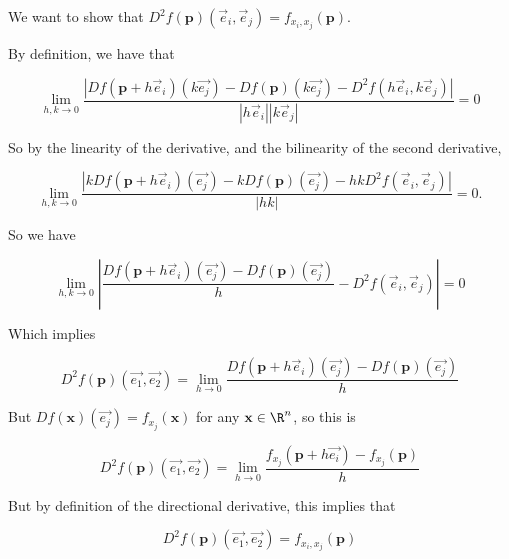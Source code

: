 \documentclass{ximera}
\begin{document}
\begin{free-response}
	We want to show that $D^2f(\mathbf{p})(\vec{e}_i,\vec{e}_j) = f_{x_i,x_j}(\mathbf{p})$.
	
	By definition, we have that 
	
	\[
		\displaystyle\lim_{h,k \to 0} \frac{\left| Df(\mathbf{p}+h\vec{e}_i)(k\vec{e_j}) - Df(\mathbf{p})(k\vec{e_j}) - D^2f(h\vec{e}_i,k\vec{e}_j) \right|}{|h\vec{e}_i||k\vec{e}_j|} = 0
	\]
	
	So by the linearity of the derivative, and the bilinearity of the second derivative,
	
	\[
		\displaystyle\lim_{h,k \to 0} \frac{\left| kDf(\mathbf{p}+h\vec{e}_i)(\vec{e_j}) - k Df(\mathbf{p})(\vec{e_j}) - hkD^2f(\vec{e}_i,\vec{e}_j) \right|}{|hk|} = 0.
	\]
	
	So we have 
	
	\[
	\displaystyle\lim_{h,k \to 0} \left| \frac{Df(\mathbf{p}+h\vec{e}_i)(\vec{e_j}) - Df(\mathbf{p})(\vec{e_j})}{h} - D^2f(\vec{e}_i,\vec{e}_j) \right|= 0
	\]
	
	Which implies
	
	\[
	  D^2f(\mathbf{p})(\vec{e_1},\vec{e_2})  = \displaystyle\lim_{h \to 0}  \frac{ Df(\mathbf{p}+h\vec{e}_i)(\vec{e_j}) - Df(\mathbf{p})(\vec{e_j}) }{h}
	\]
	
	But $Df(\mathbf{x})(\vec{e_j}) = f_{x_j}(\mathbf{x})$ for any $\mathbf{x} \in \R^n$, so this is 
	
	\[
	  D^2f(\mathbf{p})(\vec{e_1},\vec{e_2})  = \displaystyle\lim_{h \to 0}  \frac{ f_{x_j}(\mathbf{p}+h\vec{e_i}) - f_{x_j}(\mathbf{p}) }{h}
	\]
	
	But by definition of the directional derivative, this implies that  
	
	\[
		 D^2f(\mathbf{p})(\vec{e_1},\vec{e_2})  = f_{x_i,x_j}(\mathbf{p})
	\]
	
\end{free-response} 
\end{document}
